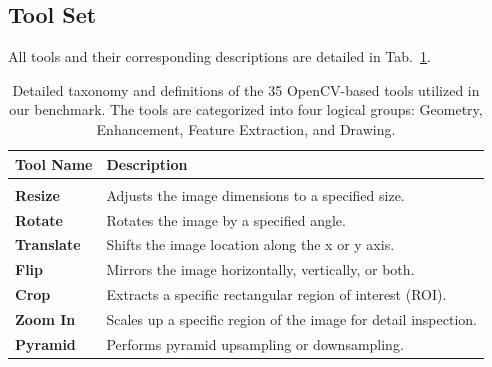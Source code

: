\documentclass[runningheads]{llncs}
\begin{document}
\subsection{Tool Set}\label{app:tool_set}
All tools and their corresponding descriptions are detailed in Tab.~\ref{tab:tool_taxonomy}.
\begin{table}[tb]
    \centering
    \caption{Detailed taxonomy and definitions of the 35 OpenCV-based tools utilized in our benchmark. The tools are categorized into four logical groups: Geometry, Enhancement, Feature Extraction, and Drawing.}
    \label{tab:tool_taxonomy}
    
    \scriptsize 
    \renewcommand{\arraystretch}{1.2} 
    \setlength{\tabcolsep}{6pt} 
    
    \begin{tabularx}{\textwidth}{>{\bfseries}l X} 
        \toprule
        \rowcolor{white}
        Tool Name & \textbf{Description} \\
        \midrule
        
        \rowcolor{gray!15} \multicolumn{2}{c}{\textbf{\textsc{Geometry}}} \\
        Resize & Adjusts the image dimensions to a specified size. \\
        Rotate & Rotates the image by a specified angle. \\
        Translate & Shifts the image location along the x or y axis. \\
        Flip & Mirrors the image horizontally, vertically, or both. \\
        Crop & Extracts a specific rectangular region of interest (ROI). \\
        Zoom In & Scales up a specific region of the image for detail inspection. \\
        Pyramid & Performs pyramid upsampling or downsampling. \\
        

\end{tabularx}
\end{table}
\end{document}
